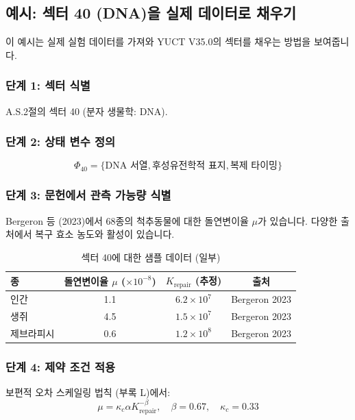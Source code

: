\documentclass[13pt,a4paper]{article}
\begin{document}
	\subsection*{예시: 섹터 40 (DNA)을 실제 데이터로 채우기}
	
	이 예시는 실제 실험 데이터를 가져와 YUCT V35.0의 섹터를 채우는 방법을 보여줍니다.
	
	\subsubsection*{단계 1: 섹터 식별}
	A.S.2절의 섹터 40 (분자 생물학: DNA).
	
	\subsubsection*{단계 2: 상태 변수 정의}
	\[
	\Phi_{40} = \{ \text{DNA 서열}, \text{후성유전학적 표지}, \text{복제 타이밍} \}
	\]
	
	\subsubsection*{단계 3: 문헌에서 관측 가능량 식별}
	Bergeron 등 (2023)에서 68종의 척추동물에 대한 돌연변이율 $\mu$가 있습니다. 다양한 출처에서 복구 효소 농도와 활성이 있습니다.
	
	\begin{table}[htbp]
		\centering
		\caption{섹터 40에 대한 샘플 데이터 (일부)}
		\begin{tabular}{lccc}
			\toprule
			\textbf{종} & \textbf{돌연변이율 $\mu$ ($\times 10^{-8}$)} & \textbf{$K_{\mathrm{repair}}$ (추정)} & \textbf{출처} \\
			\midrule
			인간 & 1.1 & $6.2 \times 10^7$ & Bergeron 2023 \\
			생쥐 & 4.5 & $1.5 \times 10^7$ & Bergeron 2023 \\
			제브라피시 & 0.6 & $1.2 \times 10^8$ & Bergeron 2023 \\
			\bottomrule
		\end{tabular}
	\end{table}
	
	\subsubsection*{단계 4: 제약 조건 적용}
	보편적 오차 스케일링 법칙 (부록 L)에서:
	\[
	\mu = \kappa_c \alpha K_{\mathrm{repair}}^{-\beta}, \quad \beta = 0.67, \quad \kappa_c = 0.33
	\]
	
\end{document}
